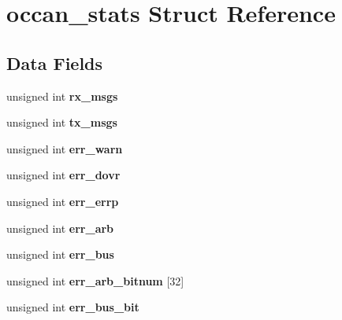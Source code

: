 \hypertarget{structoccan__stats}{}\section{occan\+\_\+stats Struct Reference}
\label{structoccan__stats}
\subsection*{Data Fields}
\begin{DoxyCompactItemize}
\item 
\mbox{\label{structoccan__stats_a1e0c536ed6b26eae2c7033c8753eab9f}} 
unsigned int {\bfseries rx\+\_\+msgs}
\item 
\mbox{\label{structoccan__stats_a47fdf1d94c95cd4ed6c05492e6a48008}} 
unsigned int {\bfseries tx\+\_\+msgs}
\item 
\mbox{\label{structoccan__stats_abcbf2a772e0bd6590b605ac175ee6866}} 
unsigned int {\bfseries err\+\_\+warn}
\item 
\mbox{\label{structoccan__stats_a03db1e283a8d05eea00358a267add016}} 
unsigned int {\bfseries err\+\_\+dovr}
\item 
\mbox{\label{structoccan__stats_a1e77b0e53e0630081640d183e859456b}} 
unsigned int {\bfseries err\+\_\+errp}
\item 
\mbox{\label{structoccan__stats_ad59746c46561eddb6fddca010dff555c}} 
unsigned int {\bfseries err\+\_\+arb}
\item 
\mbox{\label{structoccan__stats_aadb9cb62c566893ca086313a013014e9}} 
unsigned int {\bfseries err\+\_\+bus}
\item 
\mbox{\label{structoccan__stats_aedb80046a26c225be4fc769f0f05f7e9}} 
unsigned int {\bfseries err\+\_\+arb\+\_\+bitnum} \mbox{[}32\mbox{]}
\item 
\mbox{\label{structoccan__stats_a7b05b1cf219c23044278250642ecc884}} 
unsigned int {\bfseries err\+\_\+bus\+\_\+bit}
\item 

\end{DoxyCompactItemize}
